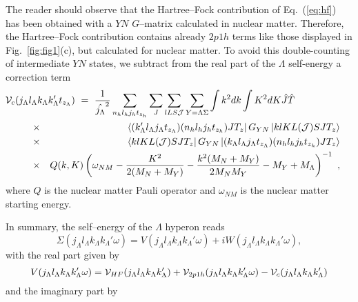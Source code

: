 The reader should observe that the Hartree--Fock contribution of
Eq.\ (\ref{eq:hf}) has been obtained with a $YN$ $G$--matrix
calculated in nuclear matter. Therefore, the Hartree--Fock contribution
contains
already $2p1h$ terms like those displayed in Fig.\ \ref{fig:fig1}(c),
but calculated for nuclear matter. 
To avoid this
double-counting of intermediate $YN$ states, we subtract
from the
real part of the $\Lambda$ self-energy
a correction term
\begin{eqnarray}
\lefteqn{\hspace{-0.5cm}{\cal V}_{c}(j_{\Lambda}l_{\Lambda}k_{\Lambda}
      k_{\Lambda}'t_{z_{\Lambda}}) \ = \
      {\displaystyle \frac{1}
      {\hat{j_{\Lambda}}^2}\sum_{n_hl_hj_ht_{z_h}}
      \sum_{J}\sum_{lLS{\cal J}}\sum_{Y=\Lambda\Sigma}\int k^{2}dk
      \int K^{2}dK\hat{J}\hat{T}}}\hspace{0.5cm}\nonumber \\
      &\times& \left\langle (k_{\Lambda}'l_{\Lambda}j_{\Lambda}
      t_{z_{\Lambda}})(n_hl_hj_ht_{z_h})JT_z\right |
      G_{YN}\left | klKL({\cal J})SJT_z \right \rangle\nonumber \\
      &\times& \left\langle klKL({\cal J})SJT_z \right | G_{YN}
      \left | (k_{\Lambda}l_{\Lambda}j_{\Lambda}
      t_{z_{\Lambda}})(n_hl_hj_ht_{z_h})JT_z \right \rangle \nonumber
      \\
      &\times& Q(k,K)\left(\omega_{NM} -\frac{K^2}{2(M_N+M_Y)} -
      \frac{k^2(M_N+M_Y)}{2M_NM_Y}-M_Y+M_\Lambda\right)^{-1} \ ,
   \label{eq:vc}
\end{eqnarray}
where $Q$ is the nuclear matter Pauli operator
and $\omega_{NM}$ is the nuclear matter starting
energy.


In summary, the self--energy of the $\Lambda$ hyperon reads
\begin{equation}
    \Sigma(j_{\Lambda}l_{\Lambda}k_{\Lambda}k_{\Lambda}'\omega)=
    V(j_{\Lambda}l_{\Lambda}k_{\Lambda}k_{\Lambda}'\omega)+
    iW(j_{\Lambda}l_{\Lambda}k_{\Lambda}k_{\Lambda}'\omega),
    \label{eq:self_ener}
\end{equation}
with the real part given by
\begin{equation}
    V(j_{\Lambda}l_{\Lambda}k_{\Lambda}k_{\Lambda}'\omega)=
       {\cal V}_{HF}(j_{\Lambda}l_{\Lambda}k_{\Lambda}k_{\Lambda}')+
       {\cal V}_{2p1h}(j_{\Lambda}l_{\Lambda}k_{\Lambda}k_{\Lambda}'
        \omega)-
       {\cal V}_c(j_{\Lambda}l_{\Lambda}k_{\Lambda}k_{\Lambda}'
       )
       \label{eq:realV}
\end{equation}
and the imaginary part by

